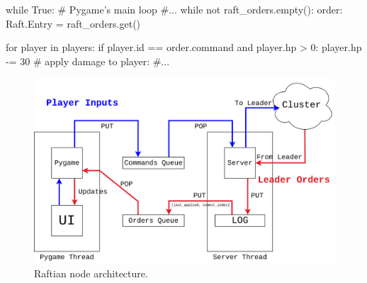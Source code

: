 \begin{python}[label={code:updateUI}, caption={Pygame periodically checks whether there are new orders and updates the UI accordingly}]
while True: # Pygame's main loop
    #...
    while not raft_orders.empty():
        order: Raft.Entry = raft_orders.get()

        for player in players:
            if player.id == order.command and player.hp > 0:
                player.hp -= 30  # apply damage to player:
                #...
\end{python}

\begin{figure}[h]
  \centering
  \includegraphics[width=\linewidth]{images/nodeArchitecture.png}
  
  \caption{Raftian node architecture.}
  \label{fig:raftianArch}
\end{figure}

